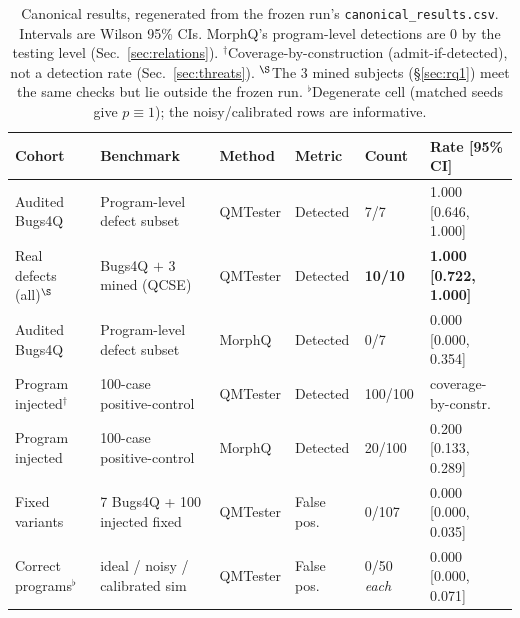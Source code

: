 \begin{table}[t]
\centering
\caption{Canonical results, regenerated from the frozen run's \texttt{canonical\_results.csv}. Intervals are Wilson 95\% CIs. MorphQ's program-level detections are $0$ by the testing level (Sec.~\ref{sec:relations}). $^{\dagger}$Coverage-by-construction (admit-if-detected), not a detection rate (Sec.~\ref{sec:threats}). $^{\S}$The 3 mined subjects (\S\ref{sec:rq1}) meet the same checks but lie outside the frozen run. $^{\flat}$Degenerate cell (matched seeds give $p\equiv1$); the noisy/calibrated rows are informative.}
\label{tab:canonical-results}
\scriptsize
\setlength{\tabcolsep}{2.4pt}
\begin{tabular}{@{}p{}p{}p{}p{}p{}p{}@{}}
\toprule
\textbf{Cohort} & \textbf{Benchmark} & \textbf{Method} & \textbf{Metric} & \textbf{Count} & \textbf{Rate [95\% CI]} \\
\midrule
Audited Bugs4Q & Program-level defect subset & QMTester & Detected & 7/7 & 1.000 [0.646, 1.000] \\
Real defects (all)$^{\S}$ & Bugs4Q $+$ 3 mined (QCSE) & QMTester & Detected & \textbf{10/10} & \textbf{1.000 [0.722, 1.000]} \\
Audited Bugs4Q & Program-level defect subset & MorphQ & Detected & 0/7 & 0.000 [0.000, 0.354] \\
Program injected$^{\dagger}$ & 100-case positive-control & QMTester & Detected & 100/100 & coverage-by-constr. \\
Program injected & 100-case positive-control & MorphQ & Detected & 20/100 & 0.200 [0.133, 0.289] \\
Fixed variants & 7 Bugs4Q + 100 injected fixed & QMTester & False pos. & 0/107 & 0.000 [0.000, 0.035] \\
Correct programs$^{\flat}$ & ideal / noisy / calibrated sim & QMTester & False pos. & 0/50 \emph{each} & 0.000 [0.000, 0.071] \\
\bottomrule
\end{tabular}
\end{table}
